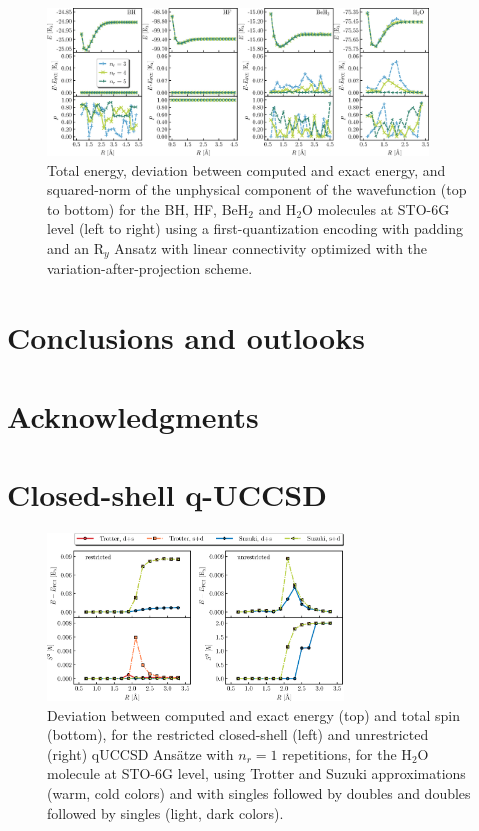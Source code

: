 \documentclass[aps,pra,twocolumn]{revtex4-2}
\begin{document}
\begin{figure}[t!]
\includegraphics[width=0.9\textwidth]{../figures/first_quantization_pad_vap_ry_linear/first_quantization_pad_vap_ry_linear.eps}
\caption{Total energy, deviation between computed and exact energy, and squared-norm of the unphysical component of the wavefunction
(top to bottom) for the BH, HF, BeH$_2$ and H$_2$O molecules at STO-6G level (left to right) 
using a first-quantization encoding with padding and an R$_y$ Ansatz with linear connectivity optimized with the variation-after-projection scheme.}
\label{figure:first_pad_vap_ry}
\end{figure} 

\section{Conclusions and outlooks}
\label{sec:conclusions}

\section*{Acknowledgments}


\appendix

\section{Closed-shell q-UCCSD}
\label{sec:cc_trotter}

\begin{figure}[t!]
\includegraphics[width=0.7\textwidth]{../figures/qUCCSD_flavors/quccsd_reps_1.eps}
\caption{Deviation between computed and exact energy (top) and total spin (bottom), for the restricted closed-shell (left) and unrestricted (right) qUCCSD Ans\"{a}tze with $n_r=1$ repetitions, for the H$_2$O molecule at STO-6G level, using Trotter and Suzuki approximations (warm, cold colors) and with singles followed by doubles and doubles followed by singles (light, dark colors).}
\label{figure:quccsd_reps_1}
\end{figure} 
\end{document}

